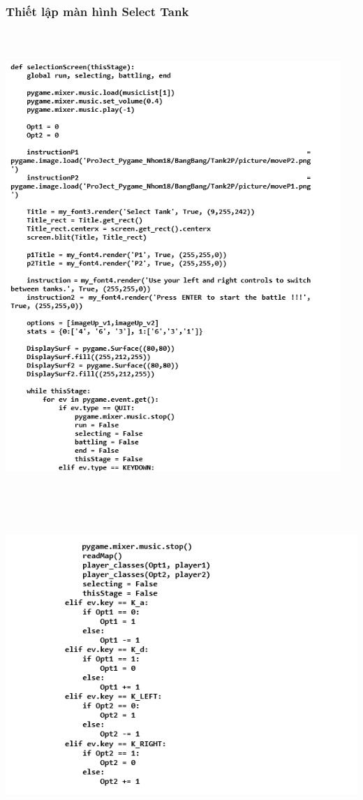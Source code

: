 \documentclass[a4paper]{article}
\begin{document}
\subsubsection{Thiết lập màn hình Select Tank}
\includegraphics[width=5in,height=7in]{image30_2.png}

\includegraphics[width=6in,height=4.5in]{image30_3.png}
\end{document}
